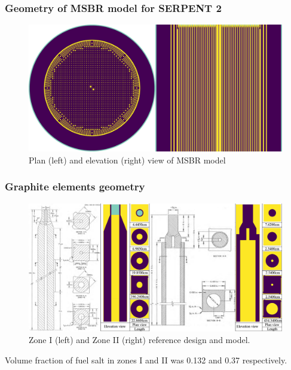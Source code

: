 \begin{frame}
  \frametitle{Geometry of \gls{MSBR} model for SERPENT 2}
    \vspace{-0.2in}
      \begin{figure}[t]
    \hspace*{-0.35in}
        \includegraphics[height=0.75\textheight]{./images/geometry_main_views.png}
        \caption{Plan (left) and elevation (right) view of \gls{MSBR} model}
  \end{figure}


\end{frame}

\begin{frame}
  \frametitle{Graphite elements geometry}
  \begin{figure}[t]
     \vspace{-0.20in}
       \hspace*{-0.4in}
       \includegraphics[height=0.77\textheight]{./images/zone_I_element.png}
            \vspace{-0.05in}
            \caption{Zone I (left) and Zone II (right) reference design
              \cite{robertson_conceptual_1971} and model.}
  \end{figure}
  
           \vspace{-0.1in}
      Volume fraction of fuel salt in zones I and II was 0.132 and 0.37 respectively.
     
\end{frame}


